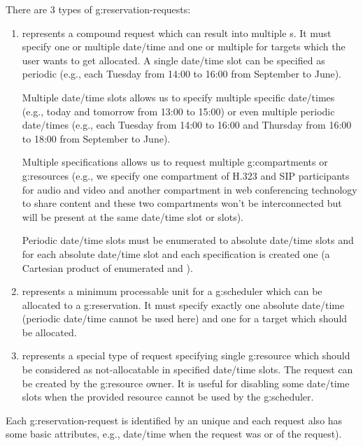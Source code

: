 There are 3 types of \glspl{g:reservation-request}:
\begin{enumerate}
\item {} represents a compound request which can result into multiple s. It must specify one or multiple date/time  and one or multiple  for targets which the user wants to get allocated. A single date/time slot can be specified as periodic (e.g., each Tuesday from 14:00 to 16:00 from September to June). 

Multiple date/time slots allows us to specify multiple specific date/times (e.g., today and tomorrow from 13:00 to 15:00) or even multiple periodic date/times (e.g., each Tuesday from 14:00 to 16:00 and Thursday from 16:00 to 18:00 from September to June).

Multiple specifications allows us to request multiple \glspl{g:compartment} or \glspl{g:resource} (e.g., we specify one compartment of H.323 and SIP participants for audio and video and another compartment in web conferencing technology to share content and these two compartments won't be interconnected but will be present at the same date/time slot or slots).

Periodic date/time slots must be enumerated to absolute date/time slots and for each absolute date/time slot and each specification is created one  (a Cartesian product of enumerated  and ).


\item {} represents a minimum processable unit for a \gls{g:scheduler} which can be allocated to a \gls{g:reservation}. It must specify exactly one absolute date/time  (periodic date/time cannot be used here) and one  for a target which should be allocated.

\item {} represents a special type of request specifying single \gls{g:resource} which should be considered as not-allocatable in specified date/time slots. The request can be created by the \gls{g:resource} owner. It is useful for disabling some date/time slots when the provided resource cannot be used by the \gls{g:scheduler}.
\end{enumerate}
Each \gls{g:reservation-request} is identified by an unique  and each request also has some basic attributes, e.g., date/time when the request was  or  of the request).

